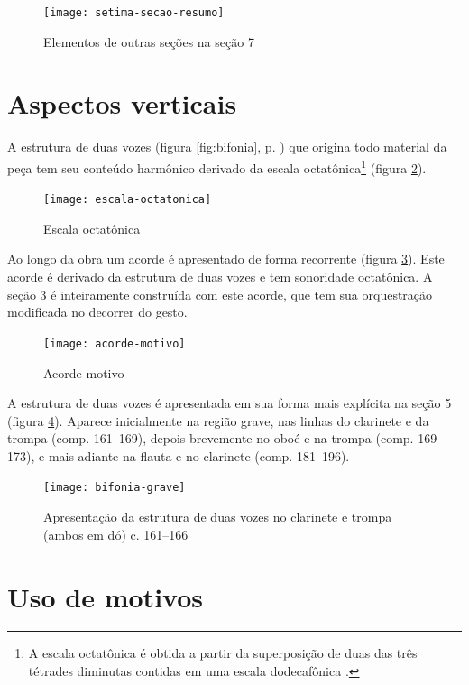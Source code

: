 \begin{figure}
  \centering
  \texttt{[image: setima-secao-resumo]}
  \caption{Elementos de outras seções na seção 7}
  \label{fig:setima-secao-resumo}
\end{figure}

\section{Aspectos verticais}
\label{sec:aspectos-verticais}

A estrutura de duas vozes (figura \ref{fig:bifonia},
p. \pageref{fig:bifonia}) que origina todo material da peça tem seu
conteúdo harmônico derivado da escala octatônica\footnote{A escala
  octatônica é obtida a partir da superposição de duas das três
  tétrades diminutas contidas em uma escala dodecafônica
  \cite[p. 76]{antokoletz90:music}.} (figura
\ref{fig:escala-octatonica}).

\begin{figure}
  \centering
  \texttt{[image: escala-octatonica]}
  \caption{Escala octatônica}
  \label{fig:escala-octatonica}
\end{figure}

Ao longo da obra um acorde é apresentado de forma recorrente (figura
\ref{fig:acorde-motivo}). Este acorde é derivado da estrutura de duas
vozes e tem sonoridade octatônica. A seção 3 é inteiramente construída
com este acorde, que tem sua orquestração modificada no decorrer do
gesto.

\begin{figure}[!t]
  \centering
  \texttt{[image: acorde-motivo]}
  \caption{Acorde-motivo}
  \label{fig:acorde-motivo}
\end{figure}

A estrutura de duas vozes é apresentada em sua forma mais explícita na
seção 5 (figura \ref{fig:bifonia-grave}). Aparece inicialmente na
região grave, nas linhas do clarinete e da trompa (comp. 161--169),
depois brevemente no oboé e na trompa (comp. 169--173), e mais adiante
na flauta e no clarinete (comp. 181--196).

\begin{figure}
  \centering
  \texttt{[image: bifonia-grave]}
  \caption{Apresentação da estrutura de duas vozes no clarinete e
    trompa (ambos em dó) c. 161--166}
  \label{fig:bifonia-grave}
\end{figure}

\section{Uso de motivos}
\label{sec:uso-de-motivos}

